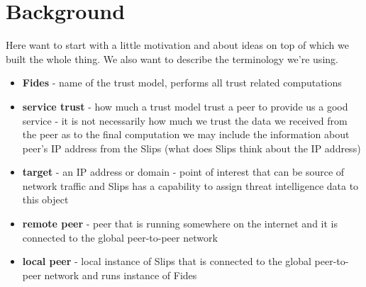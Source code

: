 \chapter{Background}
Here want to start with a little motivation and about ideas on top of which we built the whole thing. 
We also want to describe the terminology we're using.

\begin{itemize}
\item \textbf{Fides} - name of the trust model, performs all trust related computations
\item \textbf{service trust} - how much a trust model trust a peer to provide us a good service - it is not necessarily how much we trust the data we received from the peer as to the final computation we may include the information about peer's IP address from the Slips (what does Slips think about the IP address)
\item \textbf{target} - an IP address or domain - point of interest that can be source of network traffic and Slips has a capability to assign threat intelligence data to this object
\item \textbf{remote peer} - peer that is running somewhere on the internet and it is connected to the global peer-to-peer network
\item \textbf{local peer} - local instance of Slips that is connected to the global peer-to-peer network and runs instance of Fides
\end{itemize}









